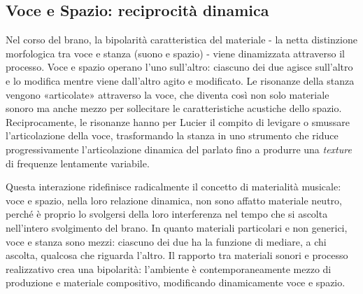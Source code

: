 \subsection{Voce e Spazio: reciprocità dinamica}
Nel corso del brano, la bipolarità caratteristica del materiale - la netta distinzione morfologica tra voce e stanza (suono e spazio) - viene dinamizzata attraverso il processo. Voce e spazio operano l'uno sull'altro: ciascuno dei due agisce sull'altro e lo modifica mentre viene dall'altro agito e modificato. Le risonanze della stanza vengono «articolate» attraverso la voce, che diventa così non solo materiale sonoro ma anche mezzo per sollecitare le caratteristiche acustiche dello spazio. Reciprocamente, le risonanze hanno per Lucier il compito di levigare o smussare l'articolazione della voce, trasformando la stanza in uno strumento che riduce progressivamente l'articolazione dinamica del parlato fino a produrre una \textit{texture} di frequenze lentamente variabile.

Questa interazione ridefinisce radicalmente il concetto di materialità musicale: voce e spazio, nella loro relazione dinamica, non sono affatto materiale neutro, perché è proprio lo svolgersi della loro interferenza nel tempo che si ascolta nell'intero svolgimento del brano. In quanto materiali particolari e non generici, voce e stanza sono mezzi: ciascuno dei due ha la funzione di mediare, a chi ascolta, qualcosa che riguarda l'altro. Il rapporto tra materiali sonori e processo realizzativo crea una bipolarità: l'ambiente è contemporaneamente mezzo di produzione e materiale compositivo, modificando dinamicamente voce e spazio.